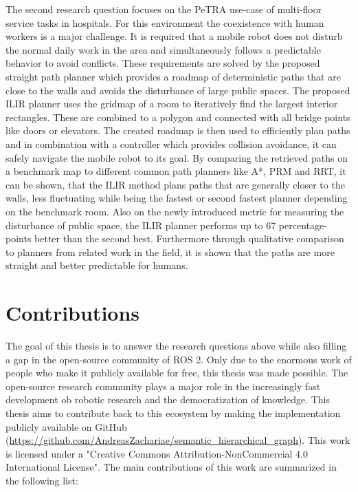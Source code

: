 The second research question focuses on the PeTRA use-case of multi-floor service tasks in hospitals. For this environment the coexistence with human workers is a major challenge. It is required that a mobile robot does not disturb the normal daily work in the area and simultaneously follows a predictable behavior to avoid conflicts. These requirements are solved by the proposed straight path planner which provides a roadmap of deterministic paths that are close to the walls and avoids the disturbance of large public spaces. The proposed ILIR planner uses the gridmap of a room to iteratively find the largest interior rectangles. These are combined to a polygon and connected with all bridge points like doors or elevators. The created roadmap is then used to efficiently plan paths and in combination with a controller which provides collision avoidance, it can safely navigate the mobile robot to its goal. By comparing the retrieved paths on a benchmark map to different common path planners like A*, PRM and RRT, it can be shown, that the ILIR method plans paths that are generally closer to the walls, less fluctuating while being the fastest or second fastest planner depending on the benchmark room. Also on the newly introduced metric for measuring the disturbance of public space, the ILIR planner performs up to 67 percentage-points better than the second best. Furthermore through qualitative comparison to planners from related work in the field, it is shown that the paths are more straight and better predictable for humans.

\section{Contributions}
\label{sec:Contributions}
The goal of this thesis is to answer the research questions above while also filling a gap in the open-source community of ROS 2. Only due to the enormous work of people who make it publicly available for free, this thesis was made possible. The open-source research community plays a major role in the increasingly fast development ob robotic research and the democratization of knowledge. This thesis aims to contribute back to this ecosystem by making the implementation publicly available on GitHub (\url{https://github.com/AndreasZachariae/semantic_hierarchical_graph}). This work is licensed under a "Creative Commons Attribution-NonCommercial 4.0 International License". The main contributions of this work are summarized in the following list:

